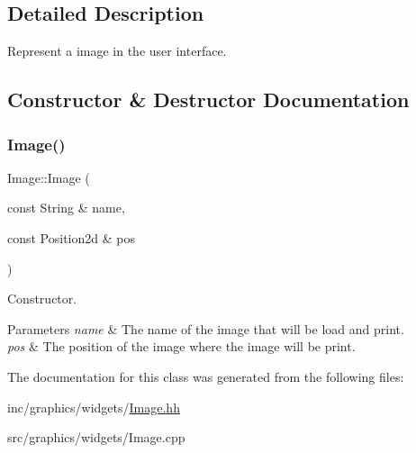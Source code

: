 \subsection{Detailed Description}
Represent a image in the user interface. 

\subsection{Constructor \& Destructor Documentation}
\mbox{\label{classImage_aca308a45e7c53ec95e244863cb31a738}} 
\subsubsection{\texorpdfstring{Image()}{Image()}}
{\footnotesize\ttfamily Image\+::\+Image (\begin{DoxyParamCaption}\item[{const String \&}]{name,  }\item[{const Position2d \&}]{pos }\end{DoxyParamCaption})}



Constructor. 


\begin{DoxyParams}{Parameters}
{\em name} & The name of the image that will be load and print. \\
\hline
{\em pos} & The position of the image where the image will be print. \\
\hline
\end{DoxyParams}


The documentation for this class was generated from the following files\+:\begin{DoxyCompactItemize}
\item 
inc/graphics/widgets/\hyperlink{Image_8hh}{Image.\+hh}\item 
src/graphics/widgets/Image.\+cpp\end{DoxyCompactItemize}
